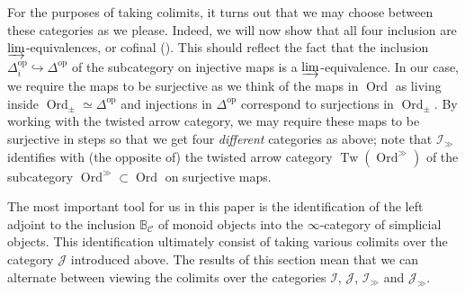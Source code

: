 \documentclass[12pt, reqno]{amsart}
\theoremstyle{plain}
\theoremstyle{definition}
\begin{document}
For the purposes of taking colimits, it turns out that we may choose between these categories as we please. Indeed, we will now show that all four inclusion are $\varinjlim$-equivalences, or cofinal (\cite[Theorem 2.19]{ClausenOrsnesJansen}). This should reflect the fact that the inclusion $\Delta_i^{\operatorname{op}}\hookrightarrow \Delta^{\operatorname{op}}$ of the subcategory on injective maps is a $\varinjlim$-equivalence. In our case, we require the maps to be surjective as we think of the maps in $\operatorname{Ord}$ as living inside $\operatorname{Ord}_\pm \simeq \Delta^{\operatorname{op}}$ and injections in $\Delta^{\operatorname{op}}$ correspond to surjections in $\operatorname{Ord}_\pm$. By working with the twisted arrow category, we may require these maps to be surjective in steps so that we get four \textit{different} categories as above; note that $\mathcal{I}_\gg$ identifies with (the opposite of) the twisted arrow category $\operatorname{Tw}(\operatorname{Ord}^\gg)$ of the subcategory $\operatorname{Ord}^\gg\subset \operatorname{Ord}$ on surjective maps.

The most important tool for us in this paper is the identification of the left adjoint to the inclusion $\mathbb{B}_{\mathcal{C}}$ of monoid objects into the $\infty$-category of simplicial objects. This identification ultimately consist of taking various colimits over the category $\mathcal{J}$ introduced above. The results of this section mean that we can alternate between viewing the colimits over the categories $\mathcal{I}$, $\mathcal{J}$, $\mathcal{I}_\gg$ and $\mathcal{J}_\gg$.
\end{document}
